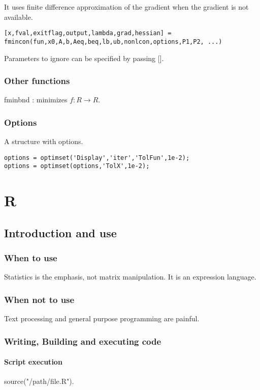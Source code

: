 \documentclass[oneside, article]{memoir}
\begin{document}
It uses finite difference approximation of the gradient when the gradient is not available.

\begin{lstlisting}
[x,fval,exitflag,output,lambda,grad,hessian] = fmincon(fun,x0,A,b,Aeq,beq,lb,ub,nonlcon,options,P1,P2, ...)
\end{lstlisting}

Parameters to ignore can be specified by passing [].

\subsection{Other functions}
fminbnd : minimizes $f:R \to R$.

\subsection{Options}
A structure with options.

\begin{lstlisting}
options = optimset('Display','iter','TolFun',1e-2);
options = optimset(options,'TolX',1e-2);
\end{lstlisting}


\chapter{R}
\section{Introduction and use}
\subsection{When to use}
Statistics is the emphasis, not matrix manipulation. It is an expression language.

\subsection{When not to use}
Text processing and general purpose programming are painful.

\subsection{Writing, Building and executing code}
\subsubsection{Script execution}
source("/path/file.R").
\end{document}
